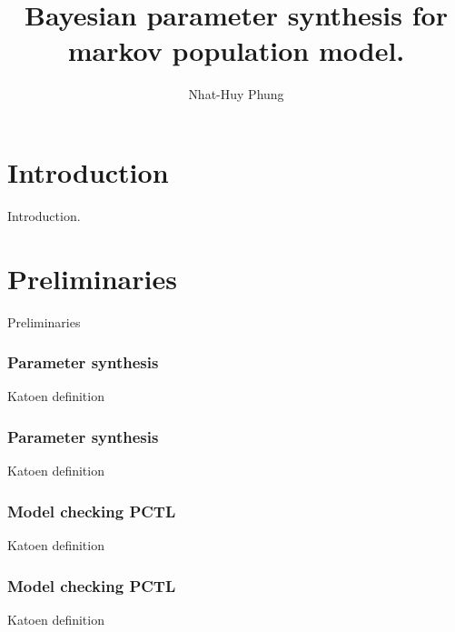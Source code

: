 \documentclass{beamer}
\title{Bayesian parameter synthesis for markov population model.}
\author{Nhat-Huy Phung}
\institute{University of Konstanz}
\begin{document}
\frame{\titlepage}
\frame{\tableofcontents}

\section{Introduction}
\begin{frame}
    \begin{center}
        \Huge Introduction.
    \end{center}
\end{frame}

\section{Preliminaries}
\begin{frame}
    \begin{center}
        \Huge Preliminaries
    \end{center}
\end{frame}


\begin{frame}
    \frametitle{Parameter synthesis}
    Katoen \cite{katoen2016probabilistic} definition
    \begin{definition}

    \end{definition}
\end{frame}

\begin{frame}
    \frametitle{Parameter synthesis}
    Katoen \cite{katoen2016probabilistic} definition
    \begin{definition}[PCTL]

    \end{definition}
\end{frame}

\begin{frame}
    \frametitle{Model checking PCTL}
    Katoen \cite{katoen2016probabilistic} definition
    \begin{definition}[PCTL]

    \end{definition}
\end{frame}

\begin{frame}
    \frametitle{Model checking PCTL}
    Katoen \cite{katoen2016probabilistic} definition
    \begin{definition}[PCTL]

    \end{definition}
\end{frame}
\end{document}

